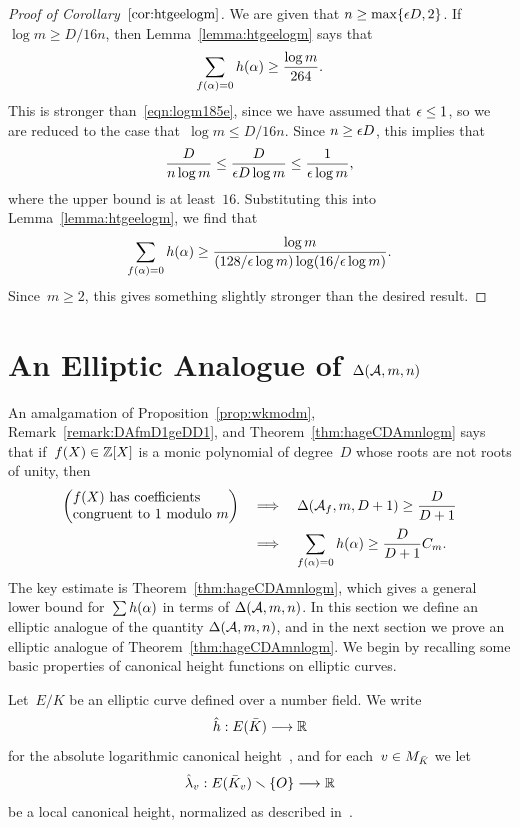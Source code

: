 \documentclass[12pt,reqno]{amsart}
\begin{document}
\begin{proof}[Proof of Corollary~$\ref{cor:htgeelogm}$]
We are given that $n\ge\max\{\epsilon D,2\}$. If $\log m\ge D/16n$,
then Lemma~\ref{lemma:htgeelogm} says that
\[
  \sum_{f(\alpha)=0}h(\alpha) \ge \frac{\log m}{264}.
\]
This is stronger than~\eqref{eqn:logm185e}, since we have assumed that
$\epsilon\le1$, so we are reduced to the case that~$\log m\le D/16n$.  Since
$n\ge\epsilon D$, this implies that
\[
  \frac{D}{n\log m}\le\frac{D}{\epsilon D\log m} \le \frac{1}{\epsilon\log m},
\]
where the upper bound is at least~$16$. Substituting this into
Lemma~\ref{lemma:htgeelogm}, we find that
\[
  \sum_{f(\alpha)=0}h(\alpha) \ge
     \frac{\log m}{(128/\epsilon\log m)\log(16/\epsilon\log m)}.
\]
Since~$m\ge2$, this gives something slightly stronger than the desired
result.
\end{proof}




\section{An Elliptic Analogue of $\Delta({\mathcal A},m,n)$}
\label{section:ellmodm}

An amalgamation of Proposition~\ref{prop:wkmodm},
Remark~\ref{remark:DAfmD1geDD1}, and Theorem~\ref{thm:hageCDAmnlogm}
says that if~$f(X)\in\mathbb{Z}[X]$ is a monic polynomial of degree~$D$ whose
roots are not roots of unity, then
\begin{align*}
  \left(\begin{tabular}{@{}l@{}}
     $f(X)$ has coefficients\\
     congruent to 1 modulo $m$\\
     \end{tabular}\right)
  &\quad\Longrightarrow\quad
     \D(\Acal_f,m,D+1) \ge \frac{D}{D+1} \\
  &\quad\Longrightarrow\quad
     \sum_{f(\a)=0} h(\a) \ge \frac{D}{D+1}C_m.
\end{align*}
The key estimate is Theorem~\ref{thm:hageCDAmnlogm}, which gives a
general lower bound for~$\sum h(\alpha)$ in terms of $\Delta({\mathcal A},m,n)$.
In this section we define an elliptic analogue of the quantity
$\Delta({\mathcal A},m,n)$, and in the next section we prove an 
elliptic analogue of Theorem~\ref{thm:hageCDAmnlogm}.
We begin by recalling some basic properties of canonical height
functions on elliptic curves.

\begin{definition}
Let~$E/K$ be an elliptic curve defined over a number field. We
write
\[
  {\hat h} : E({\bar K})\longrightarrow \mathbb{R}
\]
for the absolute logarithmic canonical height~\cite[VIII~\S9]{MR2514094},
and for each~$v\in M_{\bar K}$ we let
\[
  \hat\lambda_v : E({\bar K}_v)\smallsetminus\{O\}\longrightarrow\mathbb{R}
\]
be a local canonical height, normalized as described
in~\cite[Chapter~VI]{ATAEC}.
\end{definition}
\end{document}
